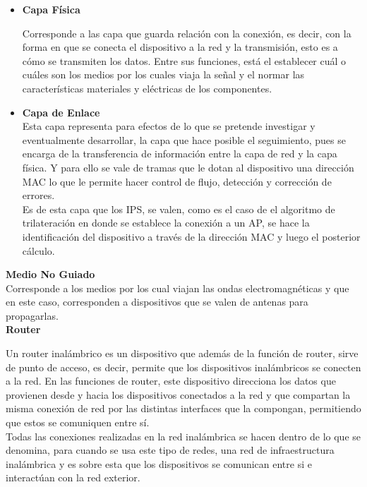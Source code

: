 \begin{itemize}

\item{\textbf{Capa Física}

Corresponde a las capa que guarda relación con la conexión, es decir, con la forma en que se conecta el dispositivo a la red y la transmisión, esto es a cómo se transmiten los datos. Entre sus funciones, está el establecer cuál o cuáles son los medios por los cuales viaja la señal y el normar las características materiales y eléctricas de los componentes.\\
}

\item{
\textbf{Capa de Enlace}\\
Esta capa representa para efectos de lo que se pretende investigar y eventualmente desarrollar, la capa que hace posible el seguimiento, pues se encarga de la transferencia de información entre la capa de red y la capa física. Y para ello se vale de tramas que le dotan al dispositivo una dirección \ac{MAC} lo que le permite hacer control de flujo, detección y corrección de errores.\\

Es de esta capa que los IPS, se valen, como es el caso de el algoritmo de trilateración en donde se establece la conexión a un AP, se hace la identificación del dispositivo a través de la dirección MAC y luego el posterior cálculo.\\
}
\end{itemize}

\newpage

\textbf{Medio No Guiado}\\

Corresponde a los medios por los cual viajan las ondas electromagnéticas y que en este caso, corresponden a dispositivos que se valen de antenas para propagarlas.\\

\textbf{Router}

Un router inalámbrico es un dispositivo que además de la función de router, sirve de punto de acceso, es decir, permite que los dispositivos inalámbricos se conecten a la red. En las funciones de router, este dispositivo direcciona los datos que provienen desde y hacia los dispositivos conectados a la red y que compartan la misma conexión de red por las distintas interfaces que la compongan, permitiendo que estos se comuniquen entre sí.\\

Todas las conexiones realizadas en la red inalámbrica se hacen dentro de lo que se denomina, para cuando se usa este tipo de redes, una red de infraestructura inalámbrica y es sobre esta que los dispositivos se comunican entre si e interactúan con la red exterior.\\

